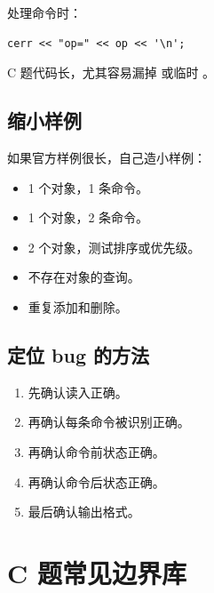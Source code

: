 处理命令时：

\begin{lstlisting}
cerr << "op=" << op << '\n';
\end{lstlisting}

C 题代码长，尤其容易漏掉  或临时 。

\subsection{缩小样例}

如果官方样例很长，自己造小样例：

\begin{itemize}
  \item 1 个对象，1 条命令。
  \item 1 个对象，2 条命令。
  \item 2 个对象，测试排序或优先级。
  \item 不存在对象的查询。
  \item 重复添加和删除。
\end{itemize}

\subsection{定位 bug 的方法}

\begin{enumerate}
  \item 先确认读入正确。
  \item 再确认每条命令被识别正确。
  \item 再确认命令前状态正确。
  \item 再确认命令后状态正确。
  \item 最后确认输出格式。
\end{enumerate}

\section{C 题常见边界库}\label{sec:07-35}

